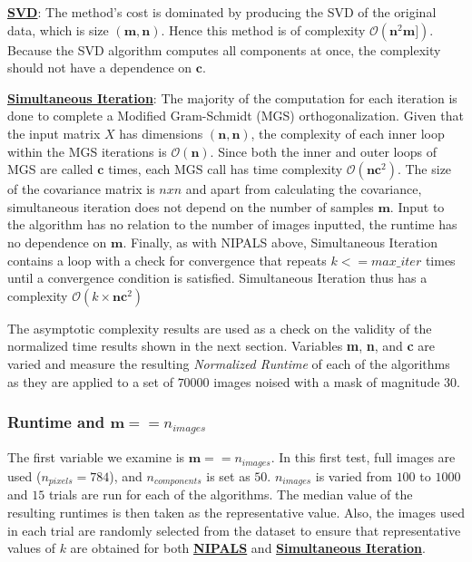 \documentclass[12pt]{article}
\begin{document}
\textbf{\hyperref[3.2]{SVD}}: The method's cost is dominated by producing the SVD of the original data, which is size $(\textbf{m}, \textbf{n})$. Hence this method is of complexity $\mathcal{O}(\textbf{n}^2 \textbf{m} ])$. Because the SVD algorithm computes all components at once, the complexity should not have a dependence on $\textbf{c}$.

\textbf{\hyperref[3.3]{Simultaneous Iteration}}: The majority of the computation for each iteration is done to complete a Modified Gram-Schmidt (MGS) orthogonalization. Given that the input matrix $X$ has dimensions $(\textbf{n}, \textbf{n})$, the complexity of each inner loop within the MGS iterations is $\mathcal{O}(\textbf{n})$. Since both the inner and outer loops of MGS are called $\textbf{c}$ times, each MGS call has time complexity $\mathcal{O}(\textbf{n}\textbf{c}^2)$. The size of the covariance matrix is $nxn$ and apart from calculating the covariance, simultaneous iteration does not depend on the number of samples $\textbf{m}$. Input to the algorithm has no relation to the number of images inputted, the runtime has no dependence on $\textbf{m}$. Finally, as with NIPALS above, Simultaneous Iteration contains a loop with a check for convergence that repeats $k <=max\_iter$ times until a convergence condition is satisfied. Simultaneous Iteration thus has a complexity $\mathcal{O}(k \times \textbf{n}\textbf{c}^2)$

The asymptotic complexity results are used as a check on the validity of the normalized time results shown in the next section. Variables \textbf{m}, \textbf{n}, and \textbf{c} are varied and measure the resulting \textit{Normalized Runtime} of each of the algorithms as they are applied to a set of $70000$ images noised with a mask of magnitude $30$.

\subsubsection{Runtime and $\textbf{m} == n_{images}$}\label{5.1.2}

The first variable we examine is $\textbf{m} == n_{images}$. In this first test, full images are used ($n_{pixels}=784$), and $n_{components}$ is set as $50$. $n_{images}$ is varied from $100$ to $1000$ and $15$ trials are run for each of the algorithms. The median value of the resulting runtimes is then taken as the representative value. Also, the images used in each trial are randomly selected from the dataset to ensure that representative values of $k$ are obtained for both \textbf{\hyperref[3.1]{NIPALS}} and \textbf{\hyperref[3.3]{Simultaneous Iteration}}.
\end{document}
